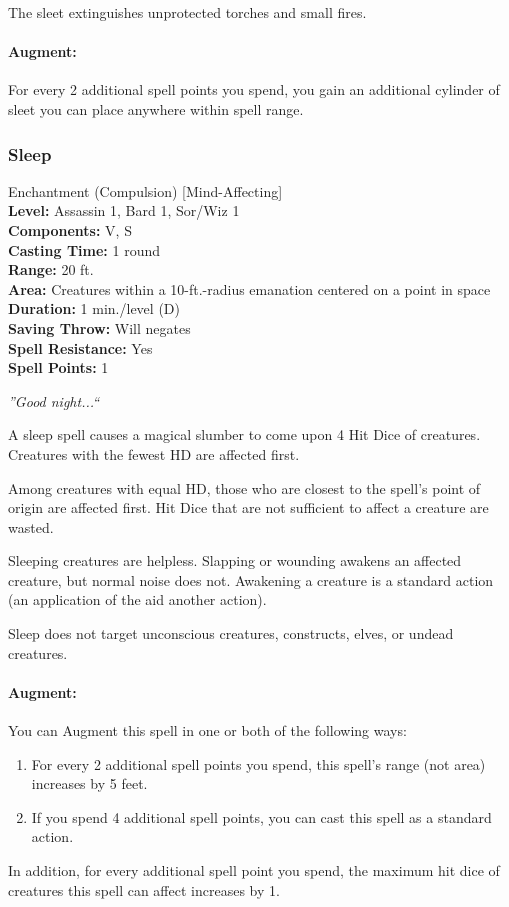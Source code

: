 The sleet extinguishes unprotected torches and small fires.

\paragraph{Augment:} For every 2 additional spell points you spend, you gain an additional cylinder of sleet you can place anywhere within spell range.
\subsubsection{Sleep}
\label{Spell:Sleep}
Enchantment (Compulsion) [Mind-Affecting]
\\ \textbf{Level:} Assassin 1, Bard 1, Sor/Wiz 1
\\ \textbf{Components:} V, S
\\ \textbf{Casting Time:} 1 round
\\ \textbf{Range:} 20 ft.
\\ \textbf{Area:} Creatures within a 10-ft.-radius emanation centered on a point in space
\\ \textbf{Duration:} 1 min./level (D)
\\ \textbf{Saving Throw:} Will negates
\\ \textbf{Spell Resistance:} Yes
\\ \textbf{Spell Points:} 1

\emph{''Good night...``}

A sleep spell causes a magical slumber to come upon 4 Hit Dice of creatures. Creatures with the fewest HD are affected first.

Among creatures with equal HD, those who are closest to the spell's point of origin are affected first. 
Hit Dice that are not sufficient to affect a creature are wasted.

Sleeping creatures are helpless. Slapping or wounding awakens an affected creature, but normal noise does not. 
Awakening a creature is a standard action (an application of the aid another action).

Sleep does not target unconscious creatures, constructs, elves, or undead creatures.

\paragraph{Augment:} You can Augment this spell in one or both of the following ways:
\begin{enumerate}
 \item For every 2 additional spell points you spend, this spell's range (not area) increases by 5 feet.%
 \item If you spend 4 additional spell points, you can cast this spell as a standard action.
\end{enumerate}
In addition, for every additional spell point you spend, the maximum hit dice of creatures this spell can affect increases by 1.

